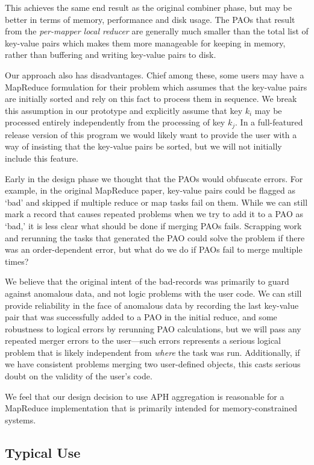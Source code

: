 \documentclass[10pt,letter,final,article,twocolumn]{article} %
\begin{document}
This achieves the same end result as the original combiner phase, but may be better in terms of memory, performance and disk usage. The PAOs that result from the \emph{per-mapper local reducer} are generally much smaller than the total list of key-value pairs which makes them more manageable for keeping in memory, rather than buffering and writing key-value pairs to disk.

Our approach also has disadvantages. Chief among these, some users may have a MapReduce formulation for their problem which assumes that the key-value pairs are initially sorted and rely on this fact to process them in sequence. We break this assumption in our prototype and explicitly assume that key $k_i$ may be processed entirely independently from the processing of key $k_j$. In a full-featured release version of this program we would likely want to provide the user with a way of insisting that the key-value pairs be sorted, but we will not initially include this feature.

Early in the design phase we thought that the PAOs would obfuscate errors. For example, in the original MapReduce paper, key-value pairs could be flagged as `bad' and skipped if multiple reduce or map tasks fail on them. While we can still mark a record that causes repeated problems when we try to add it to a PAO as `bad,' it is less clear what should be done if merging PAOs fails. Scrapping work and rerunning the tasks that generated the PAO could solve the problem if there was an order-dependent error, but what do we do if PAOs fail to merge multiple times?

We believe that  the original intent of the bad-records was primarily to guard against anomalous data, and not logic problems with the user code. We can still provide reliability in the face of anomalous data by recording the last key-value pair that was successfully added to a PAO in the initial reduce, and some robustness to logical errors by rerunning PAO calculations, but we will  pass any repeated merger errors to the user---such errors represents a serious logical problem that is likely independent from \emph{where} the task was run. Additionally, if we have consistent problems merging two user-defined objects, this casts serious doubt on the validity of the user's code.

We feel that our design decision to use APH aggregation is reasonable for a MapReduce implementation that is primarily intended for memory-constrained systems.

\subsection{Typical Use}
\end{document}
